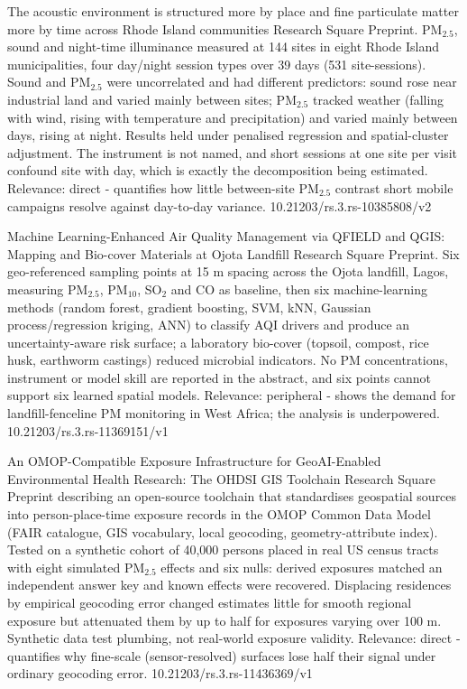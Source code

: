 \documentclass[10pt]{article}
\begin{document}
{The acoustic environment is structured more by place and fine particulate matter more by time across Rhode Island communities}
{Research Square}
{Preprint. PM$_{2.5}$, sound and night-time illuminance measured at 144 sites in eight Rhode Island municipalities, four day/night session types over 39 days (531 site-sessions). Sound and PM$_{2.5}$ were uncorrelated and had different predictors: sound rose near industrial land and varied mainly between sites; PM$_{2.5}$ tracked weather (falling with wind, rising with temperature and precipitation) and varied mainly between days, rising at night. Results held under penalised regression and spatial-cluster adjustment. The instrument is not named, and short sessions at one site per visit confound site with day, which is exactly the decomposition being estimated. Relevance: direct - quantifies how little between-site PM$_{2.5}$ contrast short mobile campaigns resolve against day-to-day variance.}
{10.21203/rs.3.rs-10385808/v2}

{Machine Learning-Enhanced Air Quality Management via QFIELD and QGIS: Mapping and Bio-cover Materials at Ojota Landfill}
{Research Square}
{Preprint. Six geo-referenced sampling points at 15 m spacing across the Ojota landfill, Lagos, measuring PM$_{2.5}$, PM$_{10}$, SO$_2$ and CO as baseline, then six machine-learning methods (random forest, gradient boosting, SVM, kNN, Gaussian process/regression kriging, ANN) to classify AQI drivers and produce an uncertainty-aware risk surface; a laboratory bio-cover (topsoil, compost, rice husk, earthworm castings) reduced microbial indicators. No PM concentrations, instrument or model skill are reported in the abstract, and six points cannot support six learned spatial models. Relevance: peripheral - shows the demand for landfill-fenceline PM monitoring in West Africa; the analysis is underpowered.}
{10.21203/rs.3.rs-11369151/v1}

{An OMOP-Compatible Exposure Infrastructure for GeoAI-Enabled Environmental Health Research: The OHDSI GIS Toolchain}
{Research Square}
{Preprint describing an open-source toolchain that standardises geospatial sources into person-place-time exposure records in the OMOP Common Data Model (FAIR catalogue, GIS vocabulary, local geocoding, geometry-attribute index). Tested on a synthetic cohort of 40,000 persons placed in real US census tracts with eight simulated PM$_{2.5}$ effects and six nulls: derived exposures matched an independent answer key and known effects were recovered. Displacing residences by empirical geocoding error changed estimates little for smooth regional exposure but attenuated them by up to half for exposures varying over 100 m. Synthetic data test plumbing, not real-world exposure validity. Relevance: direct - quantifies why fine-scale (sensor-resolved) surfaces lose half their signal under ordinary geocoding error.}
{10.21203/rs.3.rs-11436369/v1}
\end{document}
